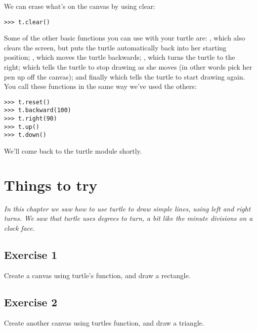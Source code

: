 We can erase what's on the canvas by using clear:

\begin{listing}
\begin{verbatim}
>>> t.clear()
\end{verbatim}
\end{listing}

Some of the other basic functions you can use with your turtle are: , which also clears the screen, but puts the turtle automatically back into her starting position; , which moves the turtle backwards; , which turns the turtle to the right;  which tells the turtle to stop drawing as she moves (in other words pick her pen up off the canvas); and finally  which tells the turtle to start drawing again. You call these functions in the same way we've used the others:

\begin{listing}
\begin{verbatim}
>>> t.reset()
>>> t.backward(100)
>>> t.right(90)
>>> t.up()
>>> t.down()
\end{verbatim}
\end{listing}

\noindent
We'll come back to the turtle module shortly.

\section{Things to try}

\emph{In this chapter we saw how to use turtle to draw simple lines, using left and right turns.  We saw that turtle uses degrees to turn, a bit like the minute divisions on a clock face.}

\subsection*{Exercise 1}
Create a canvas using turtle's  function, and draw a rectangle.

\subsection*{Exercise 2}
Create another canvas using turtles  function, and draw a triangle.

\newpage

